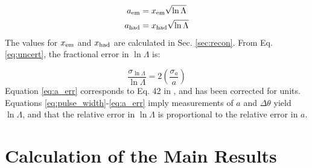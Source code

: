 \documentclass[amsmath,amssymb,aps,prd,10pt,twocolumn,showkeys]{revtex4}
\begin{document}
\begin{align}
a_{\rm em} &= x_{\rm em} \sqrt{\ln\Lambda} \label{eq:em} \\
a_{\rm had} &= x_{\rm had} \sqrt{\ln\Lambda} \label{eq:had}
\end{align}
\noindent
The values for $x_{\rm em}$ and $x_{\rm had}$ are calculated in Sec. \ref{sec:recon}. From Eq. \ref{eq:uncert}, the fractional error in $\ln\Lambda$ is:

\begin{equation}
\frac{\sigma_{\ln\Lambda}}{\ln\Lambda} = 2\left(\frac{\sigma_a}{a}\right) \label{eq:a_err}
\end{equation}
\noindent
Equation \ref{eq:a_err} corresponds to Eq. 42 in \cite{PhysRevD.105.123019}, and has been corrected for units.  Equations \ref{eq:pulse_width}-\ref{eq:a_err} imply measurements of $a$ and $\Delta\theta$ yield $\ln\Lambda$, and that the relative error in $\ln\Lambda$ is proportional to the relative error in $a$.

\section{Calculation of the Main Results}
\label{sec:onc}
\end{document}

